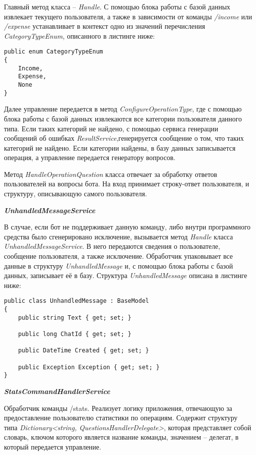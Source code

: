 Главный метод класса – \emph{Handle}. С помощью блока работы с базой
данных извлекает текущего пользователя, а также в зависимости от команды \emph{/income} или \emph{/expense} устанавливает в контекст одно из значений перечисления \emph{CategoryTypeEnum}, описанного в листинге ниже:

\lstset{style=sharpc}
\begin{lstlisting}
public enum CategoryTypeEnum
{
	Income,
	Expense,
	None
}
\end{lstlisting}

Далее управление передается в метод \emph{ConfigureOperationType}, где с помощью блока работы с базой данных извлекаются все категории
пользователя данного типа. Если таких категорий не найдено, с помощью сервиса генерации сообщений об ошибках \emph{ResultService},генерируется сообщение о том, что таких категорий не найдено. Если категории найдены, в базу данных записывается операция, а управление передается генератору вопросов.

Метод \emph{HandleOperationQuestion} класса отвечает за обработку ответов пользователей на вопросы бота. На вход принимает строку-ответ пользователя, и структуру, описывающую самого пользователя.

\textbf{\emph{UnhandledMessageService}}

В случае, если бот не поддерживает данную команду, либо внутри программного средства было сгенерировано исключение, вызывается метод \emph{Handle} класса \emph{UnhandledMessageService}. В него передаются сведения о пользователе, сообщение пользователя, а также исключение. Обработчик упаковывает все данные в структуру \emph{UnhandledMessage} и, с помощью блока работы с базой данных, записывает её в базу. Структура \emph{UnhandledMessage} описана в листинге ниже:

\lstset{style=sharpc}
\begin{lstlisting}
public class UnhandledMessage : BaseModel
{
	public string Text { get; set; }

	public long ChatId { get; set; }

	public DateTime Created { get; set; }

	public Exception Exception { get; set; }
}
\end{lstlisting}

\textbf{\emph{StatsCommandHandlerService}}

Обработчик команды /stats. Реализует логику приложения, отвечающую за предоставление пользователю статистики по операциям. Содержит структуру типа \emph{Dictionary<string, QuestionsHandlerDelegate>}, которая представляет собой словарь, ключом которого является название команды, значением – делегат, в который передается управление.

